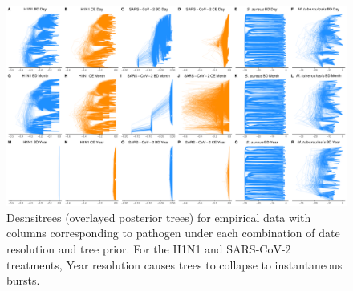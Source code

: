 \documentclass[11pt]{article}
\begin{document}
\begin{figure}[H]
    \centering
    \includegraphics[width=\textwidth]{empirical_densitrees.pdf}
    \caption{Desnsitrees (overlayed posterior trees) for empirical data with columns corresponding to pathogen under each combination of date resolution and tree prior. For the H1N1 and SARS-CoV-2 treatments, Year resolution causes trees to collapse to instantaneous bursts.}
    \label{fig:densitree}
\end{figure}
\end{document}

